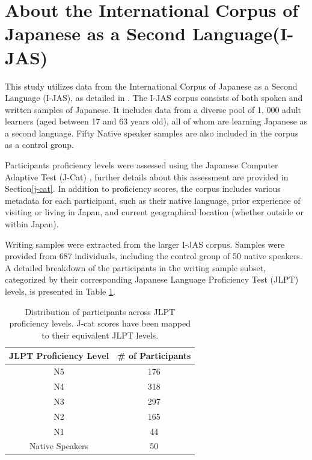 \section{About the International Corpus of Japanese as a Second Language(I-JAS)}

This study utilizes data from the International Corpus of Japanese as a Second Language (I-JAS), as
detailed in
\citet{Sakoda2020}.  The
I-JAS corpus consists of both spoken and written samples of Japanese.  It includes data from a diverse pool of 1,
000 adult learners
(aged
between 17 and 63 years old), all of whom are learning Japanese as a second language. Fifty Native speaker samples are
also
included in the corpus as a control group.

Participants proficiency levels were assessed using the Japanese Computer Adaptive Test (J-Cat)
\citep{Imai2009},  further details about this assessment are provided in
Section\ref{j-cat}. In addition to proficiency scores, the corpus includes various metadata for each participant,
such as
their
native language,
prior experience of visiting or living in Japan, and current geographical location (whether outside or within Japan).

Writing samples were extracted from the larger I-JAS corpus. Samples  were provided from 687 individuals, including the
control group
of 50 native speakers. A detailed breakdown of the participants in the writing sample subset, categorized by
their corresponding Japanese Language Proficiency Test (JLPT) levels, is presented in Table
\ref{tab:participants-chart}.

\begin{table}[h!]
\centering
\begin{tabular}{cc}
\hline \textbf{JLPT Proficiency Level} & \textbf{\# of Participants} \\ \hline
N5 & 176 \\
N4  & 318 \\
N3 & 297\\
N2 & 165 \\
N1 & 44 \\
Native Speakers & 50 \\
\hline
\end{tabular}
\caption{Distribution of participants across JLPT proficiency levels. J-cat scores have been mapped to their equivalent JLPT levels. }
\label{tab:participants-chart}
\end{table}

